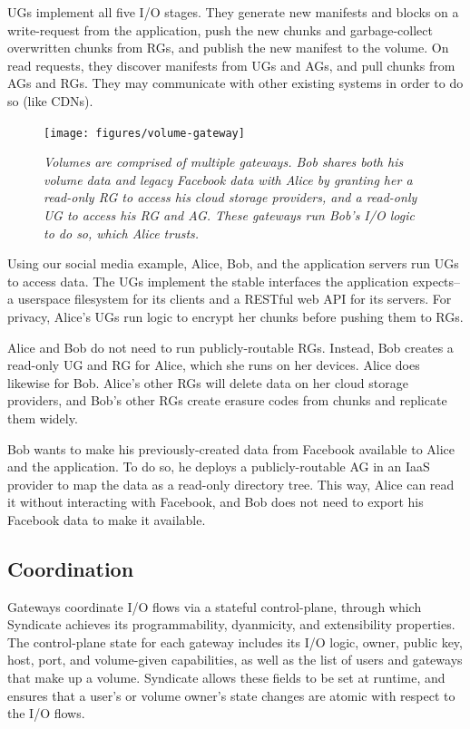 UGs implement all five I/O stages. They generate new manifests and blocks on a
write-request from the application, push the new chunks and garbage-collect
overwritten chunks from RGs, and publish the new manifest to the volume. On read
requests, they discover manifests from UGs and AGs, and pull chunks from AGs and
RGs. They may communicate with other existing systems in order to do so (like
CDNs).

\begin{figure}
\centering
\texttt{[image: figures/volume-gateway]}
\caption{\it Volumes are comprised of multiple gateways.  Bob shares both his
volume data and legacy Facebook data with Alice by granting her a read-only RG
to access his cloud storage providers, and a read-only UG to access his RG and
AG.  These gateways run Bob's I/O logic to do so, which Alice trusts.}
\label{fig:volume-gateway}
\end{figure}

Using our social media example, Alice, Bob, and the application servers run UGs
to access data. The UGs implement the stable interfaces the application
expects--a userspace filesystem for its clients and a RESTful web API for its
servers. For privacy, Alice's UGs run logic to encrypt her chunks before
pushing them to RGs.

Alice and Bob do not need to run publicly-routable RGs. Instead, Bob creates
a read-only UG and RG for Alice, which she runs on her devices. Alice does
likewise for Bob.  Alice's other RGs will delete data on her cloud storage
providers, and Bob's other RGs create erasure codes from chunks and
replicate them widely.

Bob wants to make his previously-created data from Facebook available to Alice
and the application.  To do so, he deploys a publicly-routable AG in an IaaS
provider to map the data as a read-only directory tree. This way, Alice can
read it without interacting with Facebook, and Bob does not need to export his
Facebook data to make it available.

\subsection{Coordination}

Gateways coordinate I/O flows via a stateful control-plane, through which
Syndicate achieves its programmability, dyanmicity, and extensibility
properties. The control-plane state for each gateway includes its I/O logic,
owner, public key, host, port, and volume-given capabilities, as well as the
list of users and gateways that make up a volume. Syndicate allows these fields
to be set at runtime, and ensures that a user's or volume owner's state
changes are atomic with respect to the I/O flows.

